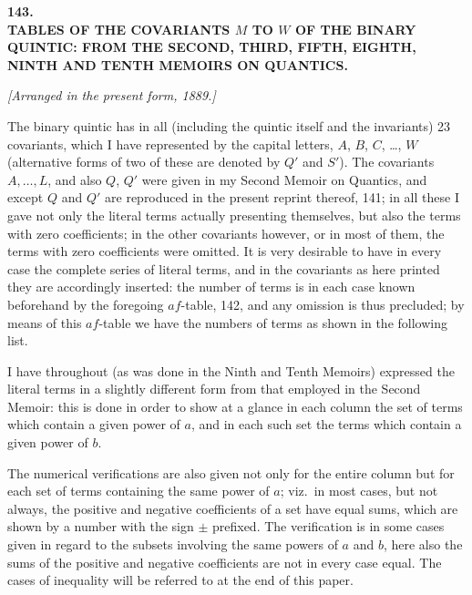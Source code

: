 \documentclass[11pt]{article}
\begin{document}

\bigskip\bigskip
\begin{center}
{\Large\bfseries 143.}\\[1ex]
{\large\bfseries TABLES OF THE COVARIANTS $M$ TO $W$ OF THE BINARY QUINTIC: FROM THE SECOND, THIRD, FIFTH, EIGHTH, NINTH AND TENTH MEMOIRS ON QUANTICS.}
\end{center}

\medskip
\noindent\textit{[Arranged in the present form, 1889.]}

\medskip

\noindent The binary quintic has in all (including the quintic itself and the invariants) 23 covariants, which I have represented by the capital letters, $A$, $B$, $C$, \ldots, $W$ (alternative forms of two of these are denoted by $Q'$ and $S'$). The covariants $A, \ldots, L$, and also $Q$, $Q'$ were given in my Second Memoir on Quantics, and except $Q$ and $Q'$ are reproduced in the present reprint thereof, 141; in all these I gave not only the literal terms actually presenting themselves, but also the terms with zero coefficients; in the other covariants however, or in most of them, the terms with zero coefficients were omitted. It is very desirable to have in every case the complete series of literal terms, and in the covariants as here printed they are accordingly inserted: the number of terms is in each case known beforehand by the foregoing $af$-table, 142, and any omission is thus precluded; by means of this $af$-table we have the numbers of terms as shown in the following list.

I have throughout (as was done in the Ninth and Tenth Memoirs) expressed the literal terms in a slightly different form from that employed in the Second Memoir: this is done in order to show at a glance in each column the set of terms which contain a given power of $a$, and in each such set the terms which contain a given power of $b$.

The numerical verifications are also given not only for the entire column but for each set of terms containing the same power of $a$; viz.\ in most cases, but not always, the positive and negative coefficients of a set have equal sums, which are shown by a number with the sign $\pm$ prefixed. The verification is in some cases given in regard to the subsets involving the same powers of $a$ and $b$, here also the sums of the positive and negative coefficients are not in every case equal. The cases of inequality will be referred to at the end of this paper.
\end{document}
